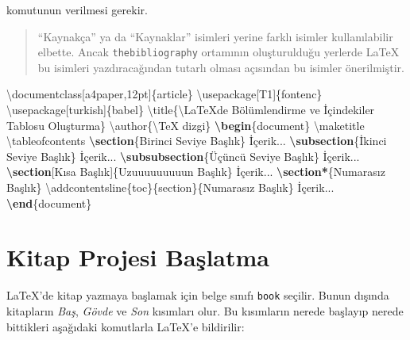 \documentclass[
  10pt,
]{scrbook}
\newenvironment{Shaded}{\begin{snugshade}}{\end{snugshade}}
\newcommand{\BuiltInTok}[1]{#1}
\newcommand{\ExtensionTok}[1]{#1}
\newcommand{\FunctionTok}[1]{\textcolor[rgb]{0.00,0.00,0.00}{#1}}
\newcommand{\KeywordTok}[1]{\textcolor[rgb]{0.13,0.29,0.53}{\textbf{#1}}}
\newcommand{\NormalTok}[1]{#1}
\theoremstyle{definition}
\theoremstyle{definition}
\theoremstyle{definition}
\theoremstyle{definition}
\theoremstyle{remark}
\begin{document}
komutunun verilmesi gerekir.

\begin{quote}
``Kaynakça'' ya da ``Kaynaklar'' isimleri yerine farklı isimler kullanılabilir elbette. Ancak \texttt{thebibliography} ortamının oluşturulduğu yerlerde LaTeX bu isimleri yazdıracağından tutarlı olması açısından bu isimler önerilmiştir.
\end{quote}

\begin{Shaded}
\begin{Highlighting}[]
\BuiltInTok{\textbackslash{}documentclass}\NormalTok{[a4paper,12pt]\{}\ExtensionTok{article}\NormalTok{\}}
\BuiltInTok{\textbackslash{}usepackage}\NormalTok{[T1]\{}\ExtensionTok{fontenc}\NormalTok{\}}
\BuiltInTok{\textbackslash{}usepackage}\NormalTok{[turkish]\{}\ExtensionTok{babel}\NormalTok{\}}
\FunctionTok{\textbackslash{}title}\NormalTok{\{}\FunctionTok{\textbackslash{}LaTeX}\NormalTok{\textquotesingle{}de Bölümlendirme  ve İçindekiler Tablosu Oluşturma\}}
\FunctionTok{\textbackslash{}author}\NormalTok{\{}\FunctionTok{\textbackslash{}TeX}\NormalTok{ dizgi\}}
\KeywordTok{\textbackslash{}begin}\NormalTok{\{}\ExtensionTok{document}\NormalTok{\}}
\FunctionTok{\textbackslash{}maketitle}
\FunctionTok{\textbackslash{}tableofcontents}
\KeywordTok{\textbackslash{}section}\NormalTok{\{Birinci Seviye Başlık\}}
\NormalTok{  İçerik...}
\KeywordTok{\textbackslash{}subsection}\NormalTok{\{İkinci Seviye Başlık\}}
\NormalTok{  İçerik...}
\KeywordTok{\textbackslash{}subsubsection}\NormalTok{\{Üçüncü Seviye Başlık\}}
\NormalTok{  İçerik...}
\KeywordTok{\textbackslash{}section}\NormalTok{[Kısa Başlık]\{Uzuuuuuuuuun Başlık\}}
\NormalTok{  İçerik...}
\KeywordTok{\textbackslash{}section*}\NormalTok{\{Numarasız Başlık\}}
\FunctionTok{\textbackslash{}addcontentsline}\NormalTok{\{toc\}\{section\}\{Numarasız Başlık\}}
\NormalTok{  İçerik...}
\KeywordTok{\textbackslash{}end}\NormalTok{\{}\ExtensionTok{document}\NormalTok{\}}
\end{Highlighting}
\end{Shaded}

\hypertarget{kitap-projesi-baux15flatma}{%
\section{Kitap Projesi Başlatma}\label{kitap-projesi-baux15flatma}}

LaTeX'de kitap yazmaya başlamak için belge sınıfı \texttt{book} seçilir. Bunun dışında kitapların \emph{Baş}, \emph{Gövde} ve \emph{Son} kısımları olur. Bu kısımların nerede başlayıp nerede bittikleri aşağıdaki komutlarla LaTeX'e bildirilir:
\end{document}

